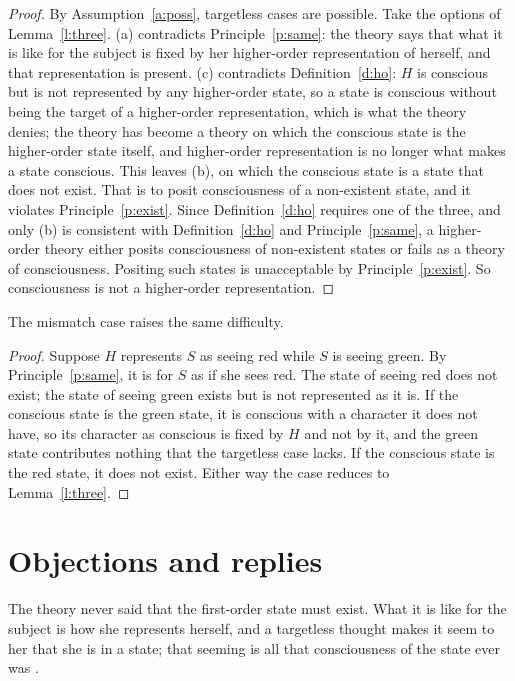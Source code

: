 \documentclass{situationist-preprint}
\begin{document}
\begin{proof}
By Assumption~\ref{a:poss}, targetless cases are possible. Take the options of Lemma~\ref{l:three}. (a) contradicts Principle~\ref{p:same}: the theory says that what it is like for the subject is fixed by her higher-order representation of herself, and that representation is present. (c) contradicts Definition~\ref{d:ho}: $H$ is conscious but is not represented by any higher-order state, so a state is conscious without being the target of a higher-order representation, which is what the theory denies; the theory has become a theory on which the conscious state is the higher-order state itself, and higher-order representation is no longer what makes a state conscious. This leaves (b), on which the conscious state is a state that does not exist. That is to posit consciousness of a non-existent state, and it violates Principle~\ref{p:exist}. Since Definition~\ref{d:ho} requires one of the three, and only (b) is consistent with Definition~\ref{d:ho} and Principle~\ref{p:same}, a higher-order theory either posits consciousness of non-existent states or fails as a theory of consciousness. Positing such states is unacceptable by Principle~\ref{p:exist}. So consciousness is not a higher-order representation.
\end{proof}

\begin{corollary}\label{c:mismatch}
The mismatch case raises the same difficulty.
\end{corollary}

\begin{proof}
Suppose $H$ represents $S$ as seeing red while $S$ is seeing green. By Principle~\ref{p:same}, it is for $S$ as if she sees red. The state of seeing red does not exist; the state of seeing green exists but is not represented as it is. If the conscious state is the green state, it is conscious with a character it does not have, so its character as conscious is fixed by $H$ and not by it, and the green state contributes nothing that the targetless case lacks. If the conscious state is the red state, it does not exist. Either way the case reduces to Lemma~\ref{l:three}.
\end{proof}

\section{Objections and replies}

\begin{objection}[Rosenthal]\label{o:ros}
The theory never said that the first-order state must exist. What it is like for the subject is how she represents herself, and a targetless thought makes it seem to her that she is in a state; that seeming is all that consciousness of the state ever was \citep{Rosenthal2011}.
\end{objection}
\end{document}
